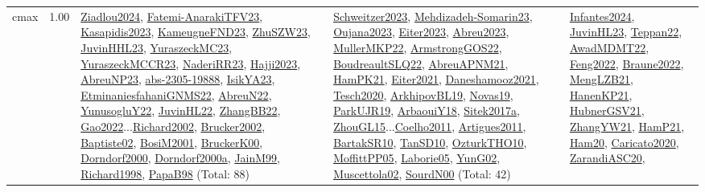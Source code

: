 {\begin{longtable}{p{3cm}r>{\raggedright\arraybackslash}p{6cm}>{\raggedright\arraybackslash}p{6cm}>{\raggedright\arraybackslash}p{8cm}}
\index{cmax}\index{Concepts!cmax}cmax &  1.00 & \hyperref[detail:Ziadlou2024]{Ziadlou2024}, \hyperref[detail:Fatemi-AnarakiTFV23]{Fatemi-AnarakiTFV23}, \hyperref[detail:Kasapidis2023]{Kasapidis2023}, \hyperref[detail:KameugneFND23]{KameugneFND23}, \hyperref[detail:ZhuSZW23]{ZhuSZW23}, \hyperref[detail:JuvinHHL23]{JuvinHHL23}, \hyperref[detail:YuraszeckMC23]{YuraszeckMC23}, \hyperref[detail:YuraszeckMCCR23]{YuraszeckMCCR23}, \hyperref[detail:NaderiRR23]{NaderiRR23}, \hyperref[detail:Hajji2023]{Hajji2023}, \hyperref[detail:AbreuNP23]{AbreuNP23}, \hyperref[detail:abs-2305-19888]{abs-2305-19888}, \hyperref[detail:IsikYA23]{IsikYA23}, \hyperref[detail:EtminaniesfahaniGNMS22]{EtminaniesfahaniGNMS22}, \hyperref[detail:AbreuN22]{AbreuN22}, \hyperref[detail:YunusogluY22]{YunusogluY22}, \hyperref[detail:JuvinHL22]{JuvinHL22}, \hyperref[detail:ZhangBB22]{ZhangBB22}, \hyperref[detail:Gao2022]{Gao2022}...\hyperref[detail:Richard2002]{Richard2002}, \hyperref[detail:Brucker2002]{Brucker2002}, \hyperref[detail:Baptiste02]{Baptiste02}, \hyperref[detail:BosiM2001]{BosiM2001}, \hyperref[detail:BruckerK00]{BruckerK00}, \hyperref[detail:Dorndorf2000]{Dorndorf2000}, \hyperref[detail:Dorndorf2000a]{Dorndorf2000a}, \hyperref[detail:JainM99]{JainM99}, \hyperref[detail:Richard1998]{Richard1998}, \hyperref[detail:PapaB98]{PapaB98} (Total: 88) & \hyperref[detail:Schweitzer2023]{Schweitzer2023}, \hyperref[detail:Mehdizadeh-Somarin23]{Mehdizadeh-Somarin23}, \hyperref[detail:Oujana2023]{Oujana2023}, \hyperref[detail:Eiter2023]{Eiter2023}, \hyperref[detail:Abreu2023]{Abreu2023}, \hyperref[detail:MullerMKP22]{MullerMKP22}, \hyperref[detail:ArmstrongGOS22]{ArmstrongGOS22}, \hyperref[detail:BoudreaultSLQ22]{BoudreaultSLQ22}, \hyperref[detail:AbreuAPNM21]{AbreuAPNM21}, \hyperref[detail:HamPK21]{HamPK21}, \hyperref[detail:Eiter2021]{Eiter2021}, \hyperref[detail:Daneshamooz2021]{Daneshamooz2021}, \hyperref[detail:Tesch2020]{Tesch2020}, \hyperref[detail:ArkhipovBL19]{ArkhipovBL19}, \hyperref[detail:Novas19]{Novas19}, \hyperref[detail:ParkUJR19]{ParkUJR19}, \hyperref[detail:ArbaouiY18]{ArbaouiY18}, \hyperref[detail:Sitek2017a]{Sitek2017a}, \hyperref[detail:ZhouGL15]{ZhouGL15}...\hyperref[detail:Coelho2011]{Coelho2011}, \hyperref[detail:Artigues2011]{Artigues2011}, \hyperref[detail:BartakSR10]{BartakSR10}, \hyperref[detail:TanSD10]{TanSD10}, \hyperref[detail:OzturkTHO10]{OzturkTHO10}, \hyperref[detail:MoffittPP05]{MoffittPP05}, \hyperref[detail:Laborie05]{Laborie05}, \hyperref[detail:YunG02]{YunG02}, \hyperref[detail:Muscettola02]{Muscettola02}, \hyperref[detail:SourdN00]{SourdN00} (Total: 42) & \hyperref[detail:Infantes2024]{Infantes2024}, \hyperref[detail:JuvinHL23]{JuvinHL23}, \hyperref[detail:Teppan22]{Teppan22}, \hyperref[detail:AwadMDMT22]{AwadMDMT22}, \hyperref[detail:Feng2022]{Feng2022}, \hyperref[detail:Braune2022]{Braune2022}, \hyperref[detail:MengLZB21]{MengLZB21}, \hyperref[detail:HanenKP21]{HanenKP21}, \hyperref[detail:HubnerGSV21]{HubnerGSV21}, \hyperref[detail:ZhangYW21]{ZhangYW21}, \hyperref[detail:HamP21]{HamP21}, \hyperref[detail:Ham20]{Ham20}, \hyperref[detail:Caricato2020]{Caricato2020}, \hyperref[detail:ZarandiASC20]{ZarandiASC20}, 
\end{longtable}}
